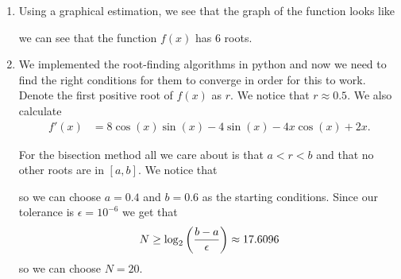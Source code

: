 \documentclass[11pt, a4paper]{article}
\begin{document}
\begin{solution} \phantom{}
  \begin{enumerate}
  \item[(1)] Using a graphical estimation, we see that the graph of the
    function looks like
    \begin{figure}[H]
    \begin{center}
    \end{center}
    \end{figure}
    we can see that the function $f(x)$ has $6$ roots.
  \item[(2)] We implemented the root-finding algorithms in python and now
    we need to find the right conditions for them to converge in order for
    this to work. Denote the first positive root of $f(x)$ as $r$.
    We notice that $r \approx 0.5$.
    We also calculate
    \begin{align*}
      f'(x) &= 8 \cos\left(x\right) \sin\left(x\right) -
      4 \sin\left(x\right) - 4x \cos\left(x\right) + 2x.
    \end{align*}

    For the bisection method all we care about is that $a < r < b$
    and that no other roots are in $[a,b]$.
    We notice that
    \begin{center}
    \end{center}
    so we can choose $a = 0.4$ and $b = 0.6$ as the starting conditions.
    Since our tolerance is $\epsilon = 10^{-6}$ we get that
    \[
      N \geq \log_2\del{\frac{b - a}{\epsilon}} \approx 17.6096
    \]
    so we can choose $N = 20$.


\end{enumerate}
\end{solution}
\end{document}
